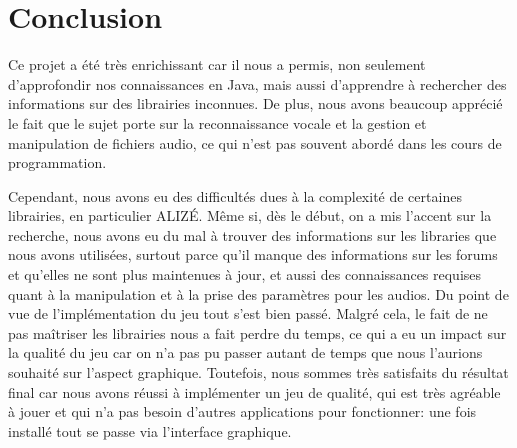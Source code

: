 \section{Conclusion}
\label{sec:conclusion}

Ce projet a été très enrichissant car il nous a permis, non seulement d'approfondir nos connaissances en Java, mais aussi d'apprendre à rechercher des
informations sur des librairies inconnues. De plus, nous avons beaucoup apprécié le fait que le sujet porte sur la reconnaissance vocale et la gestion et
manipulation de fichiers audio, ce qui n'est pas souvent abordé dans les cours de programmation.

Cependant, nous avons eu des difficultés dues à la complexité de certaines librairies, en particulier ALIZÉ. Même si, dès le début, on a mis l'accent sur la
recherche, nous avons eu du mal à trouver des informations sur les libraries que nous avons utilisées, surtout parce qu'il manque des informations sur les forums et qu'elles ne sont plus maintenues à jour, et aussi des connaissances requises quant à la manipulation et à la prise des paramètres pour les audios.
Du point de vue de l'implémentation du jeu tout s'est bien passé. Malgré cela, le fait de ne pas maîtriser les librairies nous a fait perdre du temps, ce qui
a eu un impact sur la qualité du jeu car on n'a pas pu passer autant de temps que nous l'aurions souhaité sur l'aspect graphique. Toutefois, nous sommes
très satisfaits du résultat final car nous avons réussi à implémenter un jeu de qualité, qui est très agréable à jouer et qui n'a pas besoin d'autres
applications pour fonctionner: une fois installé tout se passe via l'interface graphique.

